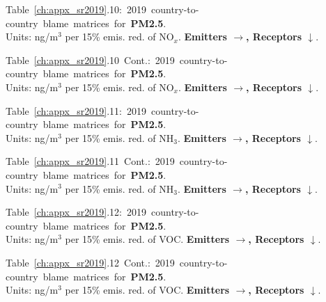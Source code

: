 \footnotesize{\mbox{Table \ref{ch:appx_sr2019}.10: 2019 country-to-country blame matrices for \textbf{PM2.5}.}\\ Units: ng/m$^3$ per 15\% emis. red. of NO$_x$. \textbf{Emitters $\rightarrow$, Receptors $\downarrow$}. }\\[\baselineskip]\enlargethispage{\myenlarge} \hspace{-0.5cm} 
\centerline{}\clearpage
\footnotesize{\mbox{Table \ref{ch:appx_sr2019}.10 Cont.: 2019 country-to-country blame matrices for \textbf{PM2.5}.}\\ Units: ng/m$^3$ per 15\% emis. red. of NO$_x$. \textbf{Emitters $\rightarrow$, Receptors $\downarrow$}. }\\[\baselineskip]\enlargethispage{\myenlarge} \hspace{-0.5cm} 
\centerline{}\clearpage

\footnotesize{\mbox{Table \ref{ch:appx_sr2019}.11: 2019 country-to-country blame matrices for \textbf{PM2.5}.}\\ Units: ng/m$^3$ per 15\% emis. red. of NH$_3$. \textbf{Emitters $\rightarrow$, Receptors $\downarrow$}. }\\[\baselineskip]\enlargethispage{\myenlarge} \hspace{-0.5cm} 
\centerline{}\clearpage
\footnotesize{\mbox{Table \ref{ch:appx_sr2019}.11 Cont.: 2019 country-to-country blame matrices for \textbf{PM2.5}.}\\ Units: ng/m$^3$ per 15\% emis. red. of NH$_3$. \textbf{Emitters $\rightarrow$, Receptors $\downarrow$}. }\\[\baselineskip]\enlargethispage{\myenlarge} \hspace{-0.5cm} 
\centerline{}\clearpage

\footnotesize{\mbox{Table \ref{ch:appx_sr2019}.12: 2019 country-to-country blame matrices for \textbf{PM2.5}.}\\ Units: ng/m$^3$ per 15\% emis. red. of VOC. \textbf{Emitters $\rightarrow$, Receptors $\downarrow$}. }\\[\baselineskip]\enlargethispage{\myenlarge} \hspace{-0.5cm} 
\centerline{}\clearpage
\footnotesize{\mbox{Table \ref{ch:appx_sr2019}.12 Cont.: 2019 country-to-country blame matrices for \textbf{PM2.5}.}\\ Units: ng/m$^3$ per 15\% emis. red. of VOC. \textbf{Emitters $\rightarrow$, Receptors $\downarrow$}. }\\[\baselineskip]\enlargethispage{\myenlarge} \hspace{-0.5cm} 
\centerline{}\clearpage


